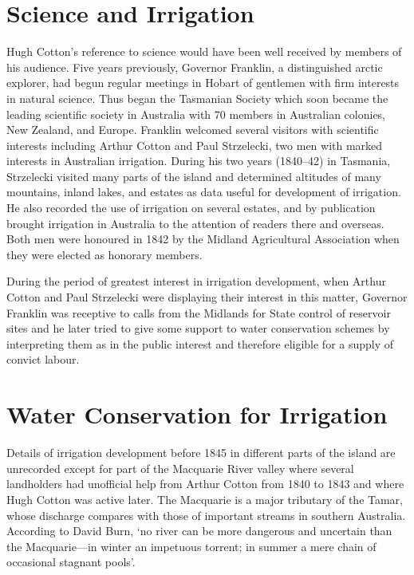 \section*{Science and Irrigation}

Hugh Cotton's reference to science would have been well received by
members of his audience.  Five years previously, Governor Franklin, a
distinguished arctic explorer, had begun regular meetings in Hobart of
gentlemen with firm interests in natural science.  Thus began the
Tasmanian Society which soon became the leading scientific society in
Australia with 70 members in Australian colonies, New Zealand, and
Europe.  Franklin welcomed several visitors with scientific interests
including Arthur Cotton and Paul Strzelecki, two men with marked
interests in Australian irrigation.  During his two years (1840--42)
in Tasmania, Strzelecki visited many parts of the island and
determined altitudes of many mountains, inland lakes, and estates as
data useful for development of irrigation. He also recorded the use of irrigation on
several estates, and by publication brought irrigation in Australia to
the attention of readers there and overseas.  Both men were honoured in 1842 by the Midland Agricultural
Association when they were elected as honorary members.

During the period of greatest interest in irrigation development, when
Arthur Cotton and Paul Strzelecki were displaying their interest in
this matter, Governor Franklin was receptive to calls from the
Midlands for State control of reservoir sites and he later tried to
give some support to water conservation schemes by interpreting them
as in the public interest and therefore eligible for a supply of
convict labour.

\section*{Water Conservation for Irrigation}

Details of irrigation development before 1845 in different parts of
the island are unrecorded except for part of the Macquarie River
valley where several landholders had unofficial help from Arthur
Cotton from 1840 to 1843 and where Hugh Cotton was active later.  The
Macquarie is a major tributary of the Tamar, whose discharge compares
with those of important streams in southern Australia. According to
David Burn, `no river can be more dangerous and uncertain than the
Macquarie---in winter an impetuous torrent; in summer a mere chain
of occasional stagnant pools'.

